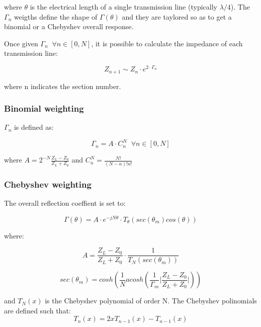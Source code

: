 \noindent where $\theta$ is the electrical length of a single transmission line (typically $\lambda/4$). The ${\Gamma_n}$ weigths define the shape of $\Gamma(\theta)$ and they are taylored so as to get a binomial or a Chebyshev overall response.

\noindent Once given $\Gamma_n \;\; \forall n \in [0, N]$, it is possible to calculate the impedance of each transmission line:

\begin{equation}
Z_{n+1} \sim Z_n \cdot e^{2\cdot\Gamma_n}
\end{equation}

\noindent where n indicates the section number.

\subsubsection{Binomial weighting}
\noindent $\Gamma_n$ is defined as:

\begin{equation}
\Gamma_n = A\cdot C^{N}_{n} \;\; \forall n \in [0, N]
\end{equation}

\noindent where $A = 2^{-N}\frac{Z_L - Z_0}{Z_L + Z_0}$ and $C^N_n = \frac{N!}{(N-n)!n!}$

\subsubsection{Chebyshev weighting}

\noindent The overall reflection coeffient is set to:

\begin{equation}
\Gamma(\theta) = A \cdot e^{-jN\theta} \cdot T_{\theta}(sec(\theta_m)cos(\theta))
\end{equation}

\noindent where:

\begin{equation}
 A = \frac{Z_L - Z_0}{Z_L + Z_0} \cdot \frac{1}{T_N(sec(\theta_m))}
\end{equation}

\begin{equation}
  sec(\theta_m) = cosh(\frac{1}{N} acosh\left( \frac{1}{\Gamma_m} \lvert \frac{Z_L - Z_0}{Z_L + Z_0} \rvert \right))
\end{equation}

\noindent and $T_N(x)$ is the Chebyshev polynomial of order N. The Chebyshev polinomials are defined such that:
\begin{equation}
 T_n(x) = 2xT_{n-1}(x) - T_{n-1}(x)
\end{equation}

